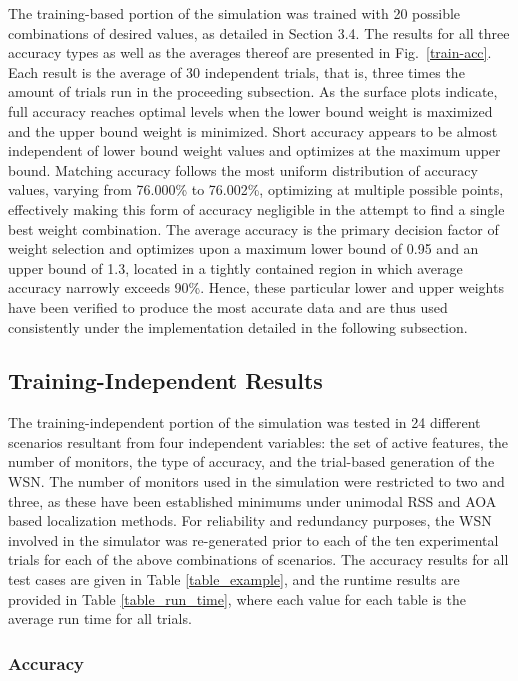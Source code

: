 \documentclass[12pt]{uthesis-v12}  %
\begin{document}
The training-based portion of the simulation was trained with 20 possible combinations of desired values, as detailed in Section 3.4. The results for all three accuracy types as well as the averages thereof are presented in Fig.~\ref{train-acc}. Each result is the average of 30 independent trials, that is, three times the amount of trials run in the proceeding subsection. As the surface plots indicate, full accuracy reaches optimal levels when the lower bound weight is maximized and the upper bound weight is minimized. Short accuracy appears to be almost independent of lower bound weight values and optimizes at the maximum upper bound. Matching accuracy follows the most uniform distribution of accuracy values, varying from 76.000\% to 76.002\%, optimizing at multiple possible points, effectively making this form of accuracy negligible in the attempt to find a single best weight combination. The average accuracy is the primary decision factor of weight selection and optimizes upon a maximum lower bound of 0.95 and an upper bound of 1.3, located in a tightly contained region in which average accuracy narrowly exceeds 90\%. Hence, these particular lower and upper weights have been verified to produce the most accurate data and are thus used consistently under the implementation detailed in the following subsection.

\subsection{Training-Independent Results}

The training-independent portion of the simulation was tested in 24 different scenarios resultant from four independent variables: the set of active features, the number of monitors, the type of accuracy, and the trial-based generation of the WSN. The number of monitors used in the simulation were restricted to two and three, as these have been established minimums under unimodal RSS and AOA based localization methods. For reliability and redundancy purposes, the WSN involved in the simulator was re-generated prior to each of the ten experimental trials for each of the above combinations of scenarios. The accuracy results for all test cases are given in Table \ref{table_example}, and the runtime results are provided in Table \ref{table_run_time}, where each value for each table is the average run time for all trials.

\subsubsection{Accuracy}
\end{document}
